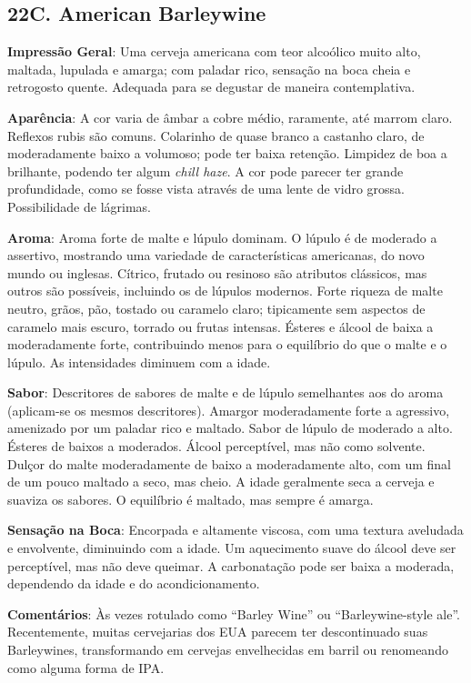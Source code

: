\subsection*{22C. American Barleywine}
\textbf{Impressão Geral}: Uma cerveja americana com teor alcoólico muito alto, maltada, lupulada e amarga; com paladar rico, sensação na boca cheia e retrogosto quente. Adequada para se degustar de maneira contemplativa.

\textbf{Aparência}: A cor varia de âmbar a cobre médio, raramente, até marrom claro. Reflexos rubis são comuns. Colarinho de quase branco a castanho claro, de moderadamente baixo a volumoso; pode ter baixa retenção. Limpidez de boa a brilhante, podendo ter algum \textit{chill haze}. A cor pode parecer ter grande profundidade, como se fosse vista através de uma lente de vidro grossa. Possibilidade de lágrimas.

\textbf{Aroma}: Aroma forte de malte e lúpulo dominam. O lúpulo é de moderado a assertivo, mostrando uma variedade de características americanas, do novo mundo ou inglesas. Cítrico, frutado ou resinoso são atributos clássicos, mas outros são possíveis, incluindo os de lúpulos modernos. Forte riqueza de malte neutro, grãos, pão, tostado ou caramelo claro; tipicamente sem aspectos de caramelo mais escuro, torrado ou frutas intensas. Ésteres e álcool de baixa a moderadamente forte, contribuindo menos para o equilíbrio do que o malte e o lúpulo. As intensidades diminuem com a idade.

\textbf{Sabor}: Descritores de sabores de malte e de lúpulo semelhantes aos do aroma (aplicam-se os mesmos descritores). Amargor moderadamente forte a agressivo, amenizado por um paladar rico e maltado. Sabor de lúpulo de moderado a alto. Ésteres de baixos a moderados. Álcool perceptível, mas não como solvente. Dulçor do malte moderadamente de baixo a moderadamente alto, com um final de um pouco maltado a seco, mas cheio. A idade geralmente seca a cerveja e suaviza os sabores. O equilíbrio é maltado, mas sempre é amarga.

\textbf{Sensação na Boca}: Encorpada e altamente viscosa, com uma textura aveludada e envolvente, diminuindo com a idade. Um aquecimento suave do álcool deve ser perceptível, mas não deve queimar. A carbonatação pode ser baixa a moderada, dependendo da idade e do acondicionamento.

\textbf{Comentários}: Às vezes rotulado como “Barley Wine” ou “Barleywine-style ale”. Recentemente, muitas cervejarias dos EUA parecem ter descontinuado suas Barleywines, transformando em cervejas envelhecidas em barril ou renomeando como alguma forma de IPA.

